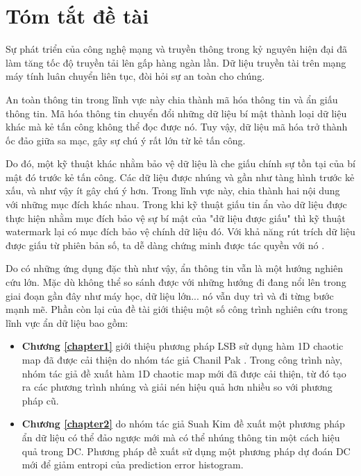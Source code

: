 \chapter*{\centering\Large{Tóm tắt đề tài}}


Sự phát triển của công nghệ mạng và truyền thông trong kỷ nguyên hiện đại đã làm tăng tốc độ truyền tải lên gấp hàng ngàn lần. Dữ liệu truyền tài trên mạng máy tính luân chuyển liên tục, đòi hỏi sự an toàn cho chúng. 

An toàn thông tin trong lĩnh vực này chia thành mã hóa thông tin và ẩn giấu thông tin. Mã hóa thông tin chuyển đổi những dữ liệu bí mật thành loại dữ liệu khác mà kẻ tấn công không thể đọc được nó. Tuy vậy, dữ liệu mã hóa trở thành ốc đảo giữa sa mạc, gây sự chú ý rất lớn từ kẻ tấn công. 

Do đó, một kỹ thuật khác nhằm bảo vệ dữ liệu là che giấu chính sự tồn tại của bí mật đó trước kẻ tấn công. Các dữ liệu được nhúng và gần như tàng hình trước kẻ xấu, và như vậy ít gây chú ý hơn. Trong lĩnh vực này, chia thành hai nội dung với những mục đích khác nhau. Trong khi kỹ thuật giấu tin ẩn vào dữ liệu được thực hiện nhằm mục đích bảo vệ sự bí mật của "dữ liệu được giấu" thì kỹ thuật watermark lại có mục đích bảo vệ chính dữ liệu đó. Với khả năng rút trích dữ liệu được giấu từ phiên bản số, ta dễ dàng chứng minh được tác quyền với nó \cite{subhedar2014current}.

Do có những ứng dụng đặc thù như vậy, ẩn thông tin vẫn là một hướng nghiên cứu lớn. Mặc dù không thể so sánh được với những hướng đi đang nổi lên trong giai đoạn gần đây như máy học, dữ liệu lớn... nó vẫn duy trì và đi từng bước mạnh mẽ. Phần còn lại của đề tài giới thiệu một số công trình nghiên cứu trong lĩnh vực ẩn dữ liệu bao gồm:

\begin{itemize}
    \item \textbf{ Chương \ref{chapter1}} giới thiệu phương pháp LSB sử dụng hàm 1D chaotic map đã được cải thiện do nhóm tác giả Chanil Pak \cite{pak2020novel}. Trong công trình này, nhóm tác giả đề xuất hàm 1D chaotic map mới đã được cải thiện, từ đó tạo ra các phương trình nhúng và giải nén hiệu quả hơn nhiều so với phương pháp cũ.
    \item \textbf{Chương \ref{chapter2}} do nhóm tác giả Suah Kim\cite{kim2019reversible} đề xuất một phương pháp ẩn dữ liệu có thể đảo ngược mới mà có thể nhúng thông tin một cách hiệu quả trong DC. Phương pháp đề xuất sử dụng một phương pháp dự đoán DC mới để giảm entropi của prediction error histogram.
\end{itemize}


